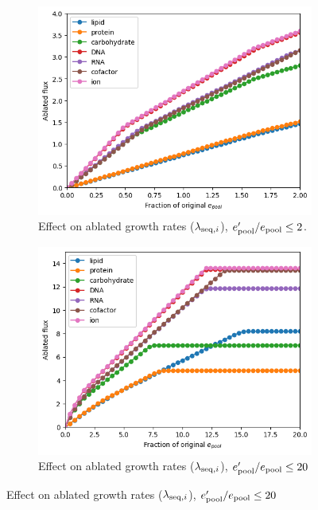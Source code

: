 \begin{figure}
  \begin{subfigure}[htpb]{0.45\textwidth}
   \centering
   \includegraphics[width=\textwidth]{epool_ec_components}
   \caption{
     Effect on ablated growth rates ($\lambda_{\mathrm{seq},i}$), $e_{\mathrm{pool}}^{\prime}/e_{\mathrm{pool}} \leq 2$.
   }
   \label{fig:model-pool-ablated}
  \end{subfigure}%
  \begin{subfigure}[htpb]{0.45\textwidth}
   \centering
   \includegraphics[width=\textwidth]{epool_ec_components_20}
   \caption{
     Effect on ablated growth rates ($\lambda_{\mathrm{seq},i}$), $e_{\mathrm{pool}}^{\prime}/e_{\mathrm{pool}} \leq 20$
   }
   \label{fig:model-pool-ablated-20}
  \end{subfigure}


\end{figure}
